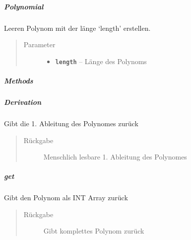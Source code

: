 \documentclass[letterpaper,10pt,ngerman]{sphinxmanual}
\begin{document}
\subparagraph{Polynomial}
\label{com/linuxluigi/polynomial/Polynomial:id2}

\begin{fulllineitems}
\label{com/linuxluigi/polynomial/Polynomial:com.linuxluigi.polynomial.Polynomial.Polynomial(int)}
Leeren Polynom mit der länge `length' erstellen.
\begin{quote}\begin{description}
\item[{Parameter}] \leavevmode\begin{itemize}
\item {} 
\textbf{\texttt{length}} -- Länge des Polynoms

\end{itemize}

\end{description}\end{quote}

\end{fulllineitems}



\subparagraph{Methods}
\label{com/linuxluigi/polynomial/Polynomial:methods}

\subparagraph{Derivation}
\label{com/linuxluigi/polynomial/Polynomial:derivation}

\begin{fulllineitems}
\label{com/linuxluigi/polynomial/Polynomial:com.linuxluigi.polynomial.Polynomial.Derivation()}
Gibt die 1. Ableitung des Polynomes zurück
\begin{quote}\begin{description}
\item[{Rückgabe}] \leavevmode
Menschlich lesbare 1. Ableitung des Polynomes

\end{description}\end{quote}

\end{fulllineitems}



\subparagraph{get}
\label{com/linuxluigi/polynomial/Polynomial:get}

\begin{fulllineitems}
\label{com/linuxluigi/polynomial/Polynomial:com.linuxluigi.polynomial.Polynomial.get()}
Gibt den Polynom als INT Array zurück
\begin{quote}\begin{description}
\item[{Rückgabe}] \leavevmode
Gibt komplettes Polynom zurück

\end{description}\end{quote}

\end{fulllineitems}
\end{document}
